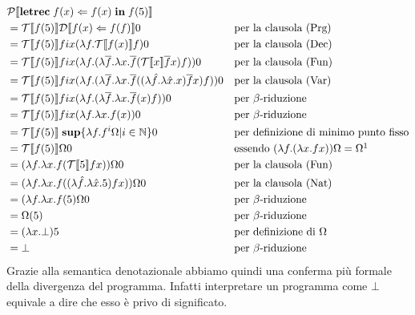     \begin{align*}
        &\mathcal{P}\doublebracket{\mbox{\textbf{letrec}}\; f(x) \Leftarrow f(x)\; \mbox{\textbf{in}}\; f(5)} &&\\
        &= \mathcal{T}\doublebracket{ f(5)}\mathcal{D}\doublebracket{ f(x)\Leftarrow f(f)} 0 &&\mbox{per la clausola (Prg)}\\
        &= \mathcal{T}\doublebracket{ f(5)} fix(\lambda f.\mathcal{T}\doublebracket{ f(x)} f)0 &&\mbox{per la clausola (Dec)}\\
        &= \mathcal{T}\doublebracket{ f(5)} fix(\lambda f. (\lambda \overline{f}.\lambda x. \overline{f}(\mathcal{T}\doublebracket{ x}\overline{f}x)f))0 &&\mbox{per la clausola (Fun)}\\
        &= \mathcal{T}\doublebracket{ f(5)} fix(\lambda f. (\lambda \overline{f}.\lambda x. \overline{f}((\lambda\hat{f}.\lambda \hat{x}.x)\overline{f}x)f))0 &&\mbox{per la clausola (Var)}\\
        &= \mathcal{T}\doublebracket{ f(5)} fix(\lambda f. (\lambda \overline{f}.\lambda x. \overline{f}(x)f))0 &&\mbox{per $\beta$-riduzione}\\
        &= \mathcal{T}\doublebracket{ f(5)} fix(\lambda f.\lambda x.f(x))0 &&\mbox{per $\beta$-riduzione}\\
        &= \mathcal{T}\doublebracket{ f(5)}\; \mbox{\textbf{sup}}\{\lambda f.f^i\Omega |i\in\mathbb{N}\}0 &&\mbox{per definizione di minimo punto fisso}\\
        &= \mathcal{T}\doublebracket{ f(5)}\Omega 0 &&\mbox{essendo $(\lambda f.(\lambda x.fx))\Omega = \Omega$}\footnotemark\\
        &= (\lambda f.\lambda x. f(\mathcal{T}\doublebracket{ 5} fx))\Omega 0 &&\mbox{per la clausola (Fun)}\\
        &= (\lambda f.\lambda x. f((\lambda\hat{f}.\lambda\hat{x}.5) fx))\Omega 0 &&\mbox{per la clausola (Nat)}\\
        &= (\lambda f.\lambda x. f(5)\Omega 0 &&\mbox{per $\beta$-riduzione}\\
        &= \Omega(5) &&\mbox{per $\beta$-riduzione}\\
        &= (\lambda x.\bot)5 &&\mbox{per definizione di $\Omega$}\\
        &= \bot &&\mbox{per $\beta$-riduzione}
    \end{align*}
    Grazie alla semantica denotazionale abbiamo quindi una conferma più formale della divergenza del programma. Infatti interpretare un programma come $\bot$ equivale a dire che esso è privo di significato.
